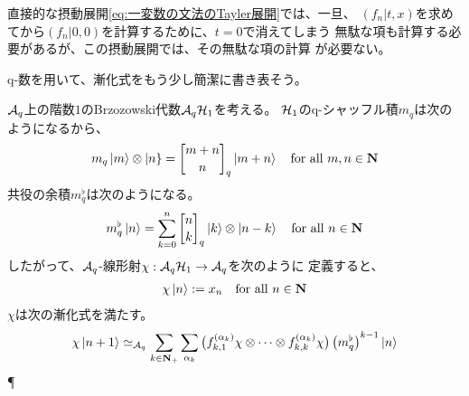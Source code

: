 {	直接的な摂動展開\eqref{eq:一変数の文法のTayler展開}では、一旦、
	$(f_n|t,x)$を求めてから$(f_n|0,0)$を計算するために、$t=0$で消えてしまう
	無駄な項も計算する必要があるが、この摂動展開では、その無駄な項の計算
	が必要ない。

	q-数を用いて、漸化式をもう少し簡潔に書き表そう。

	\begin{todo}[もっと単純に]\label{todo:もっと単純に} %
		$\mathcal{A}_q$上の階数$1$のBrzozowski代数$\mathcal{A}_q{{\mathcal{H}}}_1$を考える。
		${{\mathcal{H}}}_1$のq-シャッフル積$m_q$は次のようになるから、
		\begin{equation*}\begin{split}
			m_q\ket{m}\otimes\cket{n} = \qbinom{m+n}{n}_q\ket{m+n}
			\quad\text{for all } m,n\in\sizen
		\end{split}\end{equation*}
		共役の余積$m_q^\flat$は次のようになる。
		\begin{equation*}\begin{split}
			m_q^\flat\ket{n} = \sum_{k=0}^n \qbinom{n}{k}_q
				\ket{k}\otimes\ket{n-k} \quad\text{for all } n\in\sizen
		\end{split}\end{equation*}
		したがって、$\mathcal{A}_q$-線形射$\chi:\mathcal{A}_q{{\mathcal{H}}}_1\to\mathcal{A}_q$を次のように
		定義すると、
		\begin{equation*}\begin{split}
			\chi\mathinner{|{n}\rangle} := x_n \quad\text{for all } n\in\mathbf{N}
		\end{split}\end{equation*}
		$\chi$は次の漸化式を満たす。
		\begin{equation*}\begin{split}
			\chi\mathinner{|{n+1}\rangle} \simeq_{\mathcal{A}_q} \sum_{k\in\mathbf{N}_+}\sum_{\alpha_k} 
				\mathinner{\bigl({f_{k,1}^{(\alpha_k)}\chi\otimes\cdots\otimes 
				f_{k,k}^{(\alpha_k)}\chi}\bigr)} \mathinner{\bigl({m_q^\flat}\bigr)}^{k-1}\mathinner{|{n}\rangle}
		\end{split}\end{equation*}
		\hfill\P
	\end{todo} %

}
